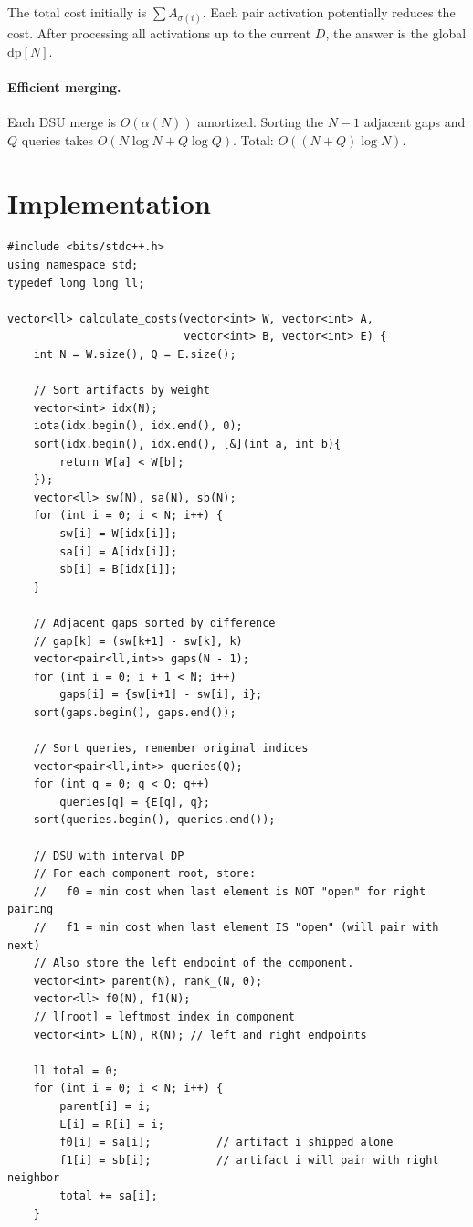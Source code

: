 \documentclass[11pt,a4paper]{article}
\begin{document}
The total cost initially is $\sum A_{\sigma(i)}$.  Each pair activation
potentially reduces the cost.  After processing all activations up to
the current $D$, the answer is the global $\mathrm{dp}[N]$.

\paragraph{Efficient merging.}
Each DSU merge is $O(\alpha(N))$ amortized.  Sorting the $N{-}1$
adjacent gaps and $Q$ queries takes $O(N \log N + Q \log Q)$.  Total:
$O((N + Q) \log N)$.

\section{Implementation}

\begin{lstlisting}
#include <bits/stdc++.h>
using namespace std;
typedef long long ll;

vector<ll> calculate_costs(vector<int> W, vector<int> A,
                           vector<int> B, vector<int> E) {
    int N = W.size(), Q = E.size();

    // Sort artifacts by weight
    vector<int> idx(N);
    iota(idx.begin(), idx.end(), 0);
    sort(idx.begin(), idx.end(), [&](int a, int b){
        return W[a] < W[b];
    });
    vector<ll> sw(N), sa(N), sb(N);
    for (int i = 0; i < N; i++) {
        sw[i] = W[idx[i]];
        sa[i] = A[idx[i]];
        sb[i] = B[idx[i]];
    }

    // Adjacent gaps sorted by difference
    // gap[k] = (sw[k+1] - sw[k], k)
    vector<pair<ll,int>> gaps(N - 1);
    for (int i = 0; i + 1 < N; i++)
        gaps[i] = {sw[i+1] - sw[i], i};
    sort(gaps.begin(), gaps.end());

    // Sort queries, remember original indices
    vector<pair<ll,int>> queries(Q);
    for (int q = 0; q < Q; q++)
        queries[q] = {E[q], q};
    sort(queries.begin(), queries.end());

    // DSU with interval DP
    // For each component root, store:
    //   f0 = min cost when last element is NOT "open" for right pairing
    //   f1 = min cost when last element IS "open" (will pair with next)
    // Also store the left endpoint of the component.
    vector<int> parent(N), rank_(N, 0);
    vector<ll> f0(N), f1(N);
    // l[root] = leftmost index in component
    vector<int> L(N), R(N); // left and right endpoints

    ll total = 0;
    for (int i = 0; i < N; i++) {
        parent[i] = i;
        L[i] = R[i] = i;
        f0[i] = sa[i];          // artifact i shipped alone
        f1[i] = sb[i];          // artifact i will pair with right neighbor
        total += sa[i];
    }


\end{lstlisting}
\end{document}
